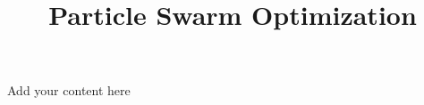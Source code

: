 \title{Particle Swarm Optimization}
\label{chp:particle-swarm-optimization}
\author{}
\institute{}
\maketitle


Add your content here





